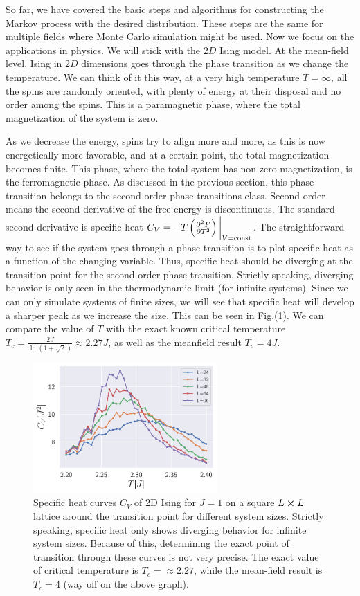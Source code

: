 \par
So far, we have covered the basic steps and algorithms for constructing the Markov process with the desired distribution. These steps are the same for multiple fields where Monte Carlo simulation might be used. Now we focus on the applications in physics. We will stick with the $2D$ Ising model. At the mean-field level, Ising in $2D$ dimensions goes through the phase transition as we change the temperature. We can think of it this way, at a very high temperature $T=\infty$, all the spins are randomly oriented, with plenty of energy at their disposal and no order among the spins. This is a paramagnetic phase, where the total magnetization of the system is zero.
\par
As we decrease the energy, spins try to align more and more, as this is now energetically more favorable, and at a certain point, the total magnetization becomes finite. This phase, where the total system has non-zero magnetization, is the ferromagnetic phase. As discussed in the previous section, this phase transition belongs to the second-order phase transitions class. Second order means the second derivative of the free energy is discontinuous. The standard second derivative is specific heat $C_V = -T \left(\pdv[2]{F}{T}\right)\bigg\rvert_{V=\text{const}}$. The straightforward way to see if the system goes through a phase transition is to plot specific heat as a function of the changing variable. Thus, specific heat should be diverging at the transition point for the second-order phase transition. Strictly speaking, diverging behavior is only seen in the thermodynamic limit (for infinite systems). Since we can only simulate systems of finite sizes, we will see that specific heat will develop a sharper peak as we increase the size. This can be seen in Fig.(\ref{gr:Ising2DCv}). We can compare the value of $T$ with the exact known critical temperature $T_c = \frac{2J}{\ln(1 + \sqrt{2})} \approx 2.27J$, as well as the meanfield result $T_c = 4J$.
\begin{figure}[H]
	\centering
	\includegraphics[width=7cm]{figures/introduction/Ising2DCv.pdf}
	\caption{Specific heat curves $C_V$ of 2D Ising for $J=1$ on a square $L \cross L$ lattice around the transition point for different system sizes. Strictly speaking, specific heat only shows diverging behavior for infinite system sizes. Because of this, determining the exact point of transition through these curves is not very precise. The exact value of critical temperature is $T_c=\approx 2.27$, while the mean-field result is $T_c = 4$ (way off on the above graph).}
	\label{gr:Ising2DCv}
\end{figure}
